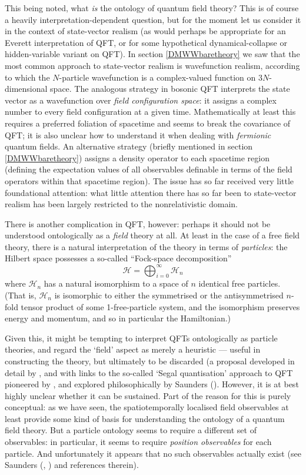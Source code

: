 \documentclass[12pt]{article}
\newcommand{\be}{\begin{equation}}
\newcommand{\ee}{\end{equation}}
\newcommand{\mc}[1]{\ensuremath{\mathcal{#1}}}
\begin{document}
This being noted, what \emph{is} the ontology of quantum field theory? This is of course a heavily interpretation-dependent question, but for the moment let us consider it in the context of state-vector realism (as would perhaps be appropriate for an Everett interpretation of QFT, or for some hypothetical dynamical-collapse or hidden-variable variant on QFT). In section \ref{DMWWbaretheory} we saw that the most common approach to state-vector realism is wavefunction realism, according to which the $N$-particle wavefunction is a complex-valued function on $3N$-dimensional space. The analogous strategy in bosonic QFT interprets the state vector as a wavefunction over \emph{field configuration space}: it assigns a complex number to every field configuration at a given time. Mathematically at least this requires a preferred foliation of spacetime and seems to break the covariance of QFT; it is also unclear how to understand it when dealing with \emph{fermionic} quantum fields. An alternative strategy (briefly mentioned in section \ref{DMWWbaretheory}) assigns a density operator to each spacetime region (defining the expectation values of all observables definable in terms of the field operators within that spacetime region). The issue has so far received very little foundational attention: what little attention there has so far been to state-vector realism has been largely restricted to the nonrelativistic domain.

There is another complication in QFT, however: perhaps it should not be understood ontologically as a \emph{field} theory at all. At least in the case of a free field theory, there is a natural interpretation of the theory in terms of \emph{particles}: the Hilbert space possesses a so-called ``Fock-space decomposition''
\be
\mc{H}=\bigoplus_{i=0}^\infty \mc{H}_n
\ee
where $\mc{H}_n$ has a natural isomorphism to a space of $n$ identical free particles. (That is, $\mc{H}_n$ is isomorphic to either the symmetrised or the antisymmetrised $n$-fold tensor product of some 1-free-particle system, and the isomorphism preserves energy and momentum, and so in particular the Hamiltonian.)

Given this, it might be tempting to interpret QFTs ontologically as particle theories, and regard the `field' aspect as merely a heuristic --- useful in constructing the theory, but ultimately to be discarded (a proposal developed in detail by , and with links to the so-called `Segal quantisation' approach to QFT pioneered by ,   and explored philosophically by Saunders (). However, it is at best highly unclear whether it can be sustained. Part of the reason for this is purely conceptual: as we have seen, the spatiotemporally localised field observables at least provide some kind of basis for understanding the ontology of a quantum field theory. But a particle ontology seems to require a different set of observables: in particular, it seems to require \emph{position observables} for each particle. And unfortunately it appears that no such observables actually exist (see Saunders (, ) and references therein).
\end{document}
